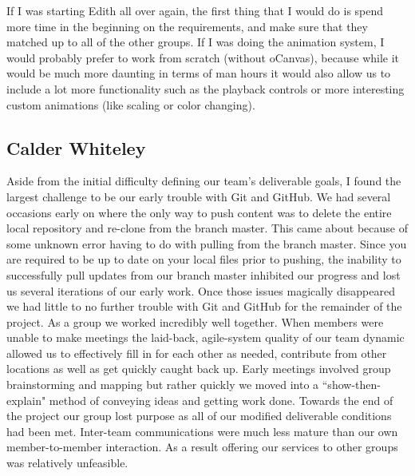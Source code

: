 \documentclass[12pt]{article}
\begin{document}
\begin{changemargin}{1cm}{0cm}
	If I was starting Edith all over again, the first thing that I would do is spend more time in the beginning on the requirements, and make sure that they matched up to all of the other groups. If I was doing the animation system, I would probably prefer to work from scratch (without oCanvas), because while it would be much more daunting in terms of man hours it would also allow us to include a lot more functionality such as the playback controls or more interesting custom animations (like scaling or color changing). 
\end{changemargin} 
\subsection{Calder Whiteley}
\begin{changemargin}{1cm}{0cm} 
Aside from the initial  difficulty defining our team's deliverable goals, I found the largest challenge to be our early trouble with Git and GitHub.
We had several occasions early on where the only way to push content was to delete the entire local repository and re-clone from the 
branch master.  This came about because of some unknown error having to do with pulling from the branch master.  Since you are 
required to be up to date on your local files prior to pushing, the inability to successfully pull updates from our branch master inhibited 
our progress and lost us several iterations of our early work.  Once those issues magically disappeared we had little to no further trouble 
with Git and GitHub for the remainder of the project.
As a group we worked incredibly well together.  When members were unable to make meetings the laid-back, agile-system quality of our 
team dynamic allowed us to effectively fill in for each other as needed, contribute from other locations as well as get quickly caught back up.
Early meetings involved group brainstorming and mapping but rather quickly we moved into a ``show-then-explain" method of conveying ideas 
and getting work done.
Towards the end of the project our group lost purpose as all of our modified deliverable conditions had been met.  Inter-team communications 
were much less mature than our own member-to-member interaction.  As a result offering our services to other groups was relatively unfeasible.
\end{changemargin} 
\end{document}
